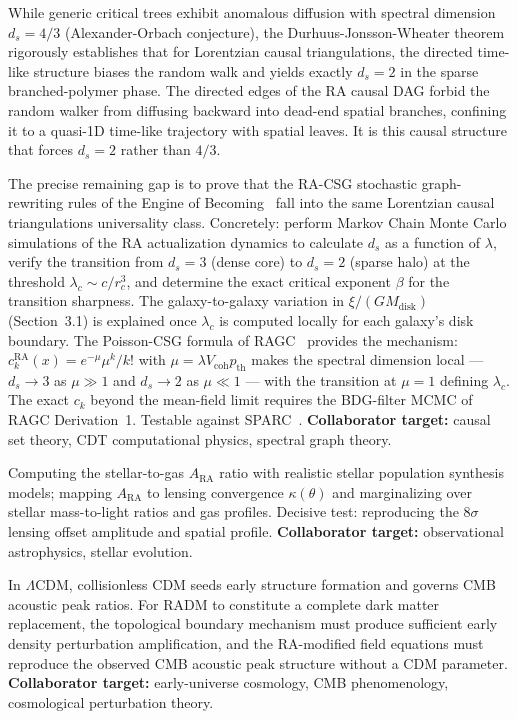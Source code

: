 \documentclass[11pt,a4paper]{article}
\theoremstyle{plain}
\theoremstyle{definition}
\theoremstyle{remark}
\newcommand{\ARA}{A_{\mathrm{RA}}}
\begin{document}
\begin{description}
  While generic critical trees exhibit anomalous diffusion with spectral
  dimension $d_s = 4/3$ (Alexander-Orbach conjecture), the
  Durhuus-Jonsson-Wheater theorem rigorously establishes that for
  Lorentzian causal triangulations, the directed time-like structure biases
  the random walk and yields exactly $d_s = 2$ in the sparse
  branched-polymer phase. The directed edges of the RA causal DAG forbid the
  random walker from diffusing backward into dead-end spatial branches,
  confining it to a quasi-1D time-like trajectory with spatial leaves. It is
  this causal structure that forces $d_s = 2$ rather than $4/3$.

  The precise remaining gap is to prove that the RA-CSG stochastic
  graph-rewriting rules of the Engine of
  Becoming~\citep{Sandeman2026RAEB} fall into the same Lorentzian causal
  triangulations universality class. Concretely: perform Markov Chain Monte
  Carlo simulations of the RA actualization dynamics to calculate $d_s$ as a
  function of $\lambda$, verify the transition from $d_s = 3$ (dense core)
  to $d_s = 2$ (sparse halo) at the threshold $\lambda_c \sim c/r_c^3$, and
  determine the exact critical exponent $\beta$ for the transition sharpness.
  The galaxy-to-galaxy variation in $\xi/(GM_{\mathrm{disk}})$ (Section~3.1)
  is explained once $\lambda_c$ is computed locally for each galaxy's disk
  boundary. The Poisson-CSG formula of RAGC~\citep{Sandeman2026b} provides the
  mechanism: $c_k^{\mathrm{RA}}(x) = e^{-\mu}\mu^k/k!$ with
  $\mu = \lambda V_{\mathrm{coh}} p_{\mathrm{th}}$ makes the spectral
  dimension local --- $d_s \to 3$ as $\mu \gg 1$ and $d_s \to 2$ as
  $\mu \ll 1$ --- with the transition at $\mu = 1$ defining $\lambda_c$.
  The exact $c_k$ beyond the mean-field limit requires the
  BDG-filter MCMC of RAGC Derivation~1. Testable against
  SPARC~\citep{Lelli2016}.
  \textbf{Collaborator target:} causal set theory, CDT computational
  physics, spectral graph theory.

  \item[Hard Wall 3: Quantitative Bullet Cluster.] Computing the stellar-to-gas
  $\ARA$ ratio with realistic stellar population synthesis models; mapping $\ARA$
  to lensing convergence $\kappa(\theta)$ and marginalizing over stellar
  mass-to-light ratios and gas profiles. Decisive test: reproducing the $8\sigma$
  lensing offset amplitude and spatial profile.
  \textbf{Collaborator target:} observational astrophysics, stellar evolution.

  \item[Hard Wall 4: CMB acoustic structure and early structure formation.] In
  $\Lambda$CDM, collisionless CDM seeds early structure formation and governs
  CMB acoustic peak ratios. For RADM to constitute a complete dark matter
  replacement, the topological boundary mechanism must produce sufficient early
  density perturbation amplification, and the RA-modified field equations must
  reproduce the observed CMB acoustic peak structure without a CDM parameter.
  \textbf{Collaborator target:} early-universe cosmology, CMB phenomenology,
  cosmological perturbation theory.


\end{description}
\end{document}
